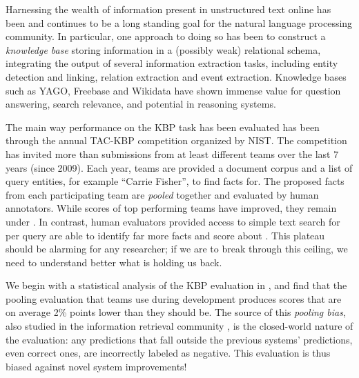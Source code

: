 Harnessing the wealth of information present in unstructured text online has been and continues to be a long standing goal for the natural language processing community.
In particular, one approach to doing so has been to construct a \textit{knowledge base} storing information in a (possibly weak) relational schema, integrating the output of several information extraction tasks, including entity detection and linking, relation extraction and event extraction.
Knowledge bases such as YAGO, Freebase and Wikidata have shown immense value for question answering, search relevance, and potential in reasoning systems\needcite.


The main way performance on the KBP task has been evaluated has been through the annual TAC-KBP competition organized by NIST.\@
The competition has invited more than  submissions from at least  different teams over the last 7 years (since 2009).
Each year, teams are provided a document corpus and a list of query entities, for example ``Carrie Fisher'', to find facts for.
The proposed facts from each participating team are \emph{pooled} together and evaluated by human annotators.
While scores of top performing teams have improved, they remain under .
In contrast, human evaluators provided access to simple text search for  per query are able to identify far more facts and score about .
This plateau should be alarming for any researcher; if we are to break through this ceiling, we need to understand better what is holding us back.

We begin with a statistical analysis of the KBP evaluation in ,
and find that the pooling evaluation that teams use during development
produces scores that are on average 2\% points lower than they should be.
The source of this \emph{pooling bias}, also studied in the information retrieval community \needcite,
is the closed-world nature of the evaluation:
any predictions that fall outside the previous systems' predictions,
even correct ones, are incorrectly labeled as negative.
This evaluation is thus biased against novel system improvements!

